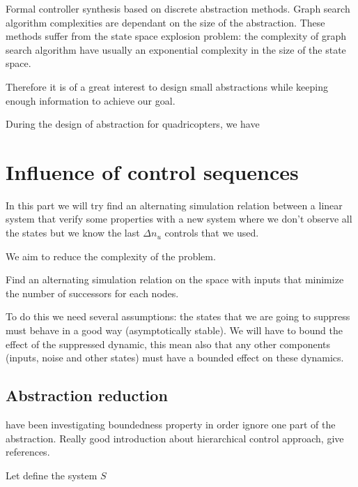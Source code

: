 Formal controller synthesis based on discrete abstraction methods.
Graph search algorithm complexities are dependant on the size of the abstraction.
These methods suffer from the state space explosion problem: the complexity of graph search algorithm have usually an exponential complexity in the size of the state space.

Therefore it is of a great interest to design small abstractions while keeping enough information to achieve our goal.

During the design of abstraction for quadricopters, we have 

\section{Influence of control sequences}
In this part we will try find an alternating simulation relation between a linear system that verify some properties with a new system where we don't observe all the states but we know the last $\Delta n_u$ controls that we used.

We aim to reduce the complexity of the problem.

\begin{problem}
Find an alternating simulation relation on the space with inputs that minimize the number of successors for each nodes.
\end{problem}

To do this we need several assumptions: the states that we are going to suppress must behave in a good way (asymptotically stable).
We will have to bound the effect of the suppressed dynamic, this mean also that any other components (inputs, noise and other states) must have a bounded effect on these dynamics.

\subsection{Abstraction reduction}
\cite{liu2014abstraction} have been investigating boundedness property in order ignore one part of the abstraction.
Really good introduction about hierarchical control approach, give references.

Let define the system $S$

